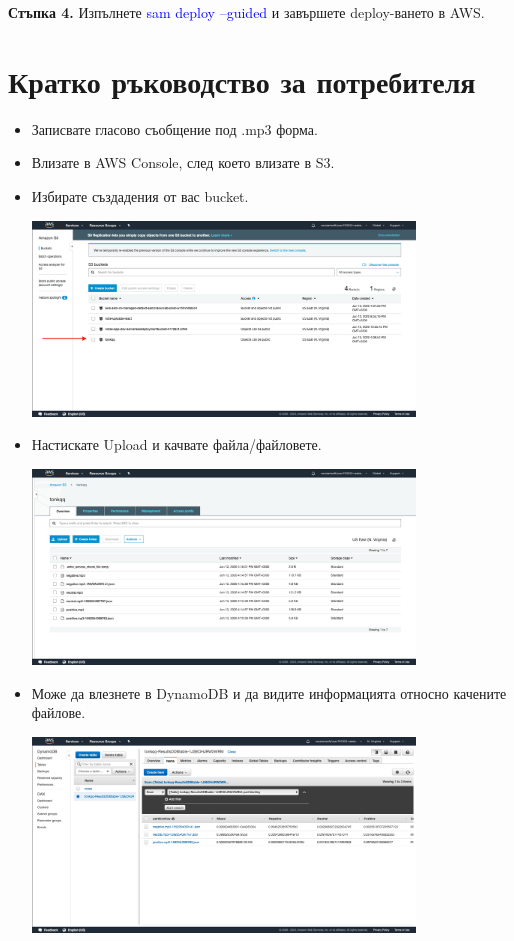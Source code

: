 \documentclass[12pt]{article}
\begin{document}
\noindent\textbf{Стъпка 4.} Изпълнете \textcolor{blue}{sam deploy --guided} и завършете deploy-ването в AWS.

\medskip

\section{Кратко ръководство за потребителя}

\begin{itemize}

\item Записвате гласово съобщение под .mp3 форма.

\item Влизате в AWS Console, след което влизате в S3.

\item Избирате създадения от вас bucket.

  \includegraphics[width=0.8\textwidth]{choose_s3_bucket.png}

\item Настискате Upload и качвате файла/файловете.

 \includegraphics[width=0.8\textwidth]{upload_files.png}

\item Може да влезнете в DynamoDB и да видите информацията относно качените файлове.

 \includegraphics[width=0.8\textwidth]{check_dynamodb.png}


\end{itemize}
\end{document}
